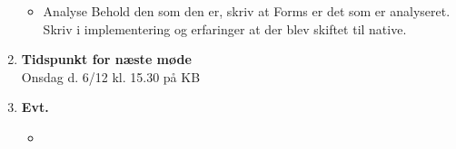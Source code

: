 \begin{enumerate}
\begin{itemize}[-]
				\item Analyse
				Behold den som den er, skriv at Forms er det som er analyseret. \\
				Skriv i implementering og erfaringer at der blev skiftet til native. \\
				
			\end{itemize}
	
		\item \textbf{Tidspunkt for næste møde} \\
			Onsdag d. 6/12 kl. 15.30 på KB
			
		\item \textbf{Evt.}
			\begin{itemize}[-]
				\item 
			\end{itemize}
			
	\end{enumerate}
